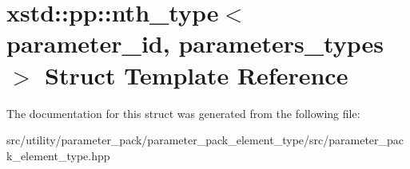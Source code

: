 \hypertarget{structxstd_1_1pp_1_1nth__type}{\section{xstd\-:\-:pp\-:\-:nth\-\_\-type$<$ parameter\-\_\-id, parameters\-\_\-types $>$ Struct Template Reference}
\label{structxstd_1_1pp_1_1nth__type}
}


The documentation for this struct was generated from the following file\-:\begin{DoxyCompactItemize}
\item 
src/utility/parameter\-\_\-pack/parameter\-\_\-pack\-\_\-element\-\_\-type/src/parameter\-\_\-pack\-\_\-element\-\_\-type.\-hpp\end{DoxyCompactItemize}
